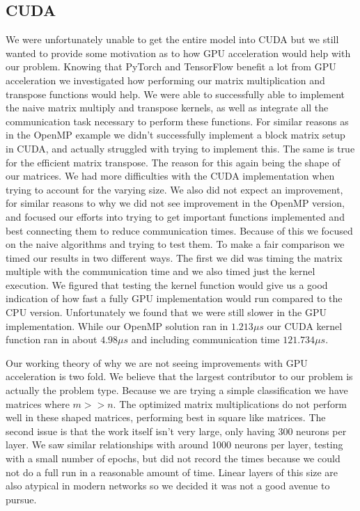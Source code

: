 \subsection{CUDA}\label{sec:r-cuda}
We were unfortunately unable to get the entire model into CUDA but we still
wanted to provide some motivation as to how GPU acceleration would help with our
problem. Knowing that PyTorch and TensorFlow benefit a lot from GPU acceleration
we investigated how performing our matrix multiplication and transpose functions
would help. We were able to successfully able to implement the naive matrix
multiply and transpose kernels, as well as integrate all the communication
task necessary to perform these functions. For similar reasons as in the OpenMP
example we didn't successfully implement a
block matrix setup in CUDA, and actually struggled with trying to implement
this. The same is true for the efficient matrix transpose. The reason for this
again being the shape of our matrices. We had more difficulties with the CUDA
implementation when trying to account for the varying size. We also did not
expect an improvement, for similar reasons to why we did not see improvement in
the OpenMP version, and focused our efforts into trying to get important
functions implemented and best connecting them to reduce communication times.
Because of this we focused on the naive algorithms and trying to test them. To
make a fair comparison we timed our results in two
different ways. The first we did was timing the matrix multiple with the
communication time and we also timed just the kernel execution. We figured that
testing the kernel function would give us a good indication of how fast a fully
GPU implementation would run compared to the CPU version. Unfortunately we found
that we were still slower in the GPU implementation. While our OpenMP solution ran
in $1.213\mu s$ our CUDA kernel function ran in about $4.98\mu s$ and including
communication time $121.734\mu s$.

Our working theory of why we are not seeing improvements with GPU acceleration
is two fold. We believe that the largest contributor to our problem is actually
the problem type. Because we are trying a simple classification we have matrices
where $m>>n$. The optimized matrix multiplications do not perform well in these
shaped matrices, performing best in square like matrices. The second issue is
that the work itself isn't very large, only having 300 neurons per layer. We saw
similar relationships with around 1000 neurons per layer, testing with a small
number of epochs, but did not record the times because we could not do a full
run in a reasonable amount of time. Linear layers of this size are also atypical
in modern networks so we decided it was not a good avenue to pursue. 
